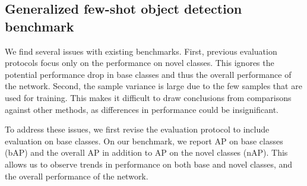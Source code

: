 \subsection{Generalized few-shot object detection benchmark}
\label{sec:revised_bench}
We find several issues with existing benchmarks.
First, previous evaluation protocols focus only on the performance on novel classes.
This ignores the potential performance drop in base classes and thus the overall performance of the network.
Second, the sample variance is large due to the few samples that are used for training.
This makes it difficult to draw conclusions from comparisons against other methods, as differences in performance could be insignificant.

To address these issues, we first revise the evaluation protocol to include evaluation on base classes. On our benchmark, we report AP on base classes (bAP) and the overall AP in addition to AP on the novel classes (nAP). This allows us to observe trends in performance on both base and novel classes, and the overall performance of the network.


